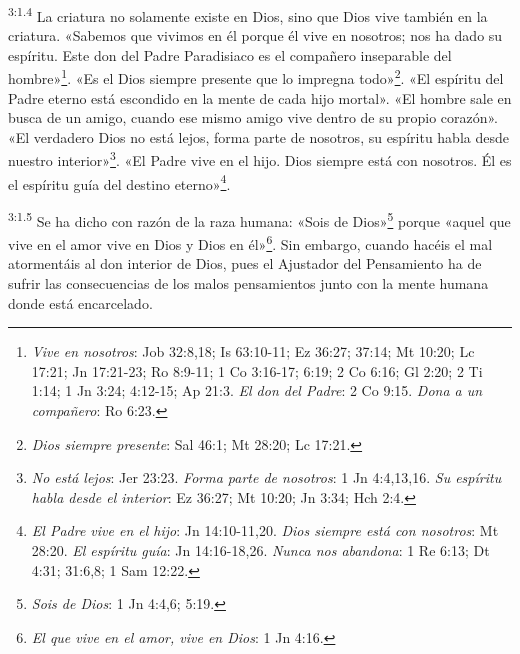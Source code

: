 \par
\textsuperscript{3:1.4} La criatura no solamente existe en Dios, sino que Dios vive también en la criatura. «Sabemos que vivimos en él porque él vive en nosotros; nos ha dado su espíritu. Este don del Padre Paradisiaco es el compañero inseparable del hombre»\footnote{\textit{Vive en nosotros}: Job 32:8,18; Is 63:10-11; Ez 36:27; 37:14; Mt 10:20; Lc 17:21; Jn 17:21-23; Ro 8:9-11; 1 Co 3:16-17; 6:19; 2 Co 6:16; Gl 2:20; 2 Ti 1:14; 1 Jn 3:24; 4:12-15; Ap 21:3. \textit{El don del Padre}: 2 Co 9:15. \textit{Dona a un compañero}: Ro 6:23.}. «Es el Dios siempre presente que lo impregna todo»\footnote{\textit{Dios siempre presente}: Sal 46:1; Mt 28:20; Lc 17:21.}. «El espíritu del Padre eterno está escondido en la mente de cada hijo mortal». «El hombre sale en busca de un amigo, cuando ese mismo amigo vive dentro de su propio corazón». «El verdadero Dios no está lejos, forma parte de nosotros, su espíritu habla desde nuestro interior»\footnote{\textit{No está lejos}: Jer 23:23. \textit{Forma parte de nosotros}: 1 Jn 4:4,13,16. \textit{Su espíritu habla desde el interior}: Ez 36:27; Mt 10:20; Jn 3:34; Hch 2:4.}. «El Padre vive en el hijo. Dios siempre está con nosotros. Él es el espíritu guía del destino eterno»\footnote{\textit{El Padre vive en el hijo}: Jn 14:10-11,20. \textit{Dios siempre está con nosotros}: Mt 28:20. \textit{El espíritu guía}: Jn 14:16-18,26. \textit{Nunca nos abandona}: 1 Re 6:13; Dt 4:31; 31:6,8; 1 Sam 12:22.}.

\par
\textsuperscript{3:1.5} Se ha dicho con razón de la raza humana: «Sois de Dios»\footnote{\textit{Sois de Dios}: 1 Jn 4:4,6; 5:19.} porque «aquel que vive en el amor vive en Dios y Dios en él»\footnote{\textit{El que vive en el amor, vive en Dios}: 1 Jn 4:16.}. Sin embargo, cuando hacéis el mal atormentáis al don interior de Dios, pues el Ajustador del Pensamiento ha de sufrir las consecuencias de los malos pensamientos junto con la mente humana donde está encarcelado.

